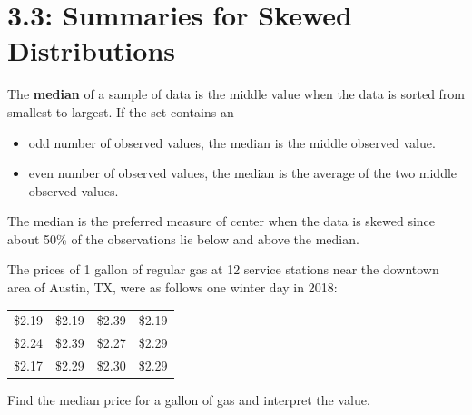 \documentclass[../mathNotesPreamble]{subfiles}
\providecommand{\relscalefact}{1.4}
\begin{document}
\relscale{\relscalefact}
  \section{3.3: Summaries for Skewed Distributions}
  \begin{defn*}
    The \textbf{median} of a sample of data is the middle value when the data is sorted from smallest to largest. If the set contains an
    \begin{itemize}
      \item odd number of observed values, the median is the middle observed value.
      \item even number of observed values, the median is the average of the two middle observed values.
    \end{itemize}
    The median is the preferred measure of center when the data is skewed since about 50\% of the observations lie below and above the median.
  \end{defn*}

  \begin{ex*}
    The prices of 1 gallon of regular gas at 12 service stations near the downtown area of Austin, TX, were as follows one winter day in 2018:
    \vspace*{\baselineskip}

    \noindent
    \begin{minipage}{0.4\linewidth}
      \begin{center}
        \begin{tabular}{@{}*{4}{c}@{}}\toprule
          \$2.19 & \$2.19 & \$2.39 & \$2.19 \\
          \$2.24 & \$2.39 & \$2.27 & \$2.29 \\
          \$2.17 & \$2.29 & \$2.30 & \$2.29 \\\bottomrule
        \end{tabular}
      \end{center}
    \end{minipage}
    \begin{minipage}{0.6\linewidth}
      \centering
    \end{minipage}
  \end{ex*}
  \noindent Find the median price for a gallon of gas and interpret the value.
  \pagebreak
\end{document}
